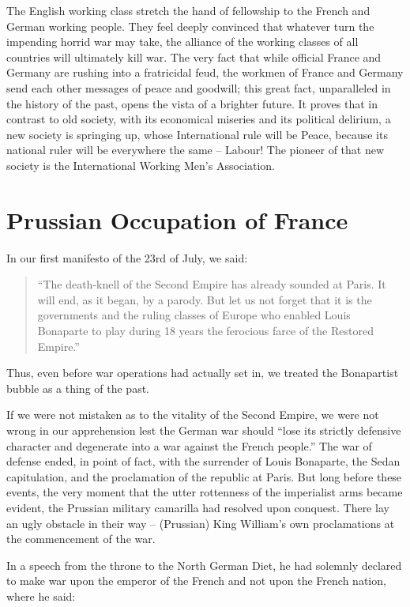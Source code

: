 \documentclass{book}
\begin{document}
The English working class stretch the hand of fellowship to the French and
German working people. They feel deeply convinced that whatever turn the
impending horrid war may take, the alliance of the working classes of all
countries will ultimately kill war. The very fact that while official
France and Germany are rushing into a fratricidal feud, the workmen of
France and Germany send each other messages of peace and goodwill; this
great fact, unparalleled in the history of the past, opens the vista of
a brighter future. It proves that in contrast to old society, with its
economical miseries and its political delirium, a new society is springing
up, whose International rule will be Peace, because its national ruler
will be everywhere the same – Labour! The pioneer of that new society is
the International Working Men’s Association.

\chapter{Prussian Occupation of France}

In our first manifesto of the 23rd of July, we said:

\begin{quote}

``The death-knell of the Second Empire has already sounded at Paris. It
will end, as it began, by a parody. But let us not forget that it is the
governments and the ruling classes of Europe who enabled Louis Bonaparte
to play during 18 years the ferocious farce of the Restored Empire.''

\end{quote}

Thus, even before war operations had actually set in, we treated the
Bonapartist bubble as a thing of the past.

If we were not mistaken as to the vitality of the Second Empire, we were
not wrong in our apprehension lest the German war should ``lose its
strictly defensive character and degenerate into a war against the French
people.'' The war of defense ended, in point of fact, with the surrender
of Louis Bonaparte, the Sedan capitulation, and the proclamation of the
republic at Paris. But long before these events, the very moment that the
utter rottenness of the imperialist arms became evident, the Prussian
military camarilla had resolved upon conquest. There lay an ugly obstacle
in their way – (Prussian) King William’s own proclamations at the
commencement of the war.

In a speech from the throne to the North German Diet, he had solemnly
declared to make war upon the emperor of the French and not upon the
French nation, where he said:
\end{document}
